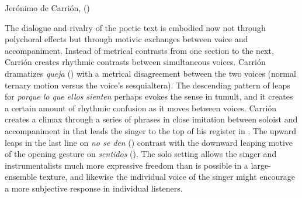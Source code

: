 \begin{musixexample}
    \caption{Jerónimo de Carrión,  ()} %

    \label{music:Carrion-Si_los_sentidos}

\end{musixexample}

The dialogue and rivalry of the poetic text is embodied now not through
polychoral effects but through motivic exchanges between voice and
accompaniment.
Instead of metrical contrasts from one section to the next, Carrión creates
rhythmic contrasts between simultaneous voices.
Carrión dramatizes \emph{queja} () with a metrical disagreement
between the two voices (normal ternary motion versus the voice's sesquialtera).
The descending pattern of leaps for \emph{porque lo que ellos sienten} perhaps
evokes the sense in tumult, and it creates a certain amount of rhythmic
confusion as it moves between voices.
Carrión creates a climax through a series of phrases in close imitation between
soloist and accompaniment in  that leads the singer to the top
of his register in .
The upward leaps in the last line on \emph{no se den} ()
contrast with the downward leaping motive of the opening gesture on
\emph{sentidos} ().
The solo setting allows the singer and instrumentalists much more expressive
freedom than is possible in a large-ensemble texture, and likewise the
individual voice of the singer might encourage a more subjective response in
individual listeners.

\endinput

\subsection{Ranking the Senses in Early Modern Philosophy}

The treatment of the senses in this villancico family reflects a common physiological model of sensation and perception, as educated Spaniards would have learned from the kind of scientific and theological treatises available to them in seminary and convent libraries in Spain and Mexico.[^seminary-libraries]
A typical example is the 1557 natural-philosophy textbook \emph{Phisica, Speculatio} by an Augustinian friar in New Spain, Alphonsus à Veracruce.
    \Autocite{Veracruce:Phisica}
Veracruce summarizes the traditional Catholic teaching, which drew on Aristotle as interpreted by Thomas Aquinas.
[@LuisdeGranada:Simbolo; @LuisdeGranada-Balcells:SimboloPtI]


